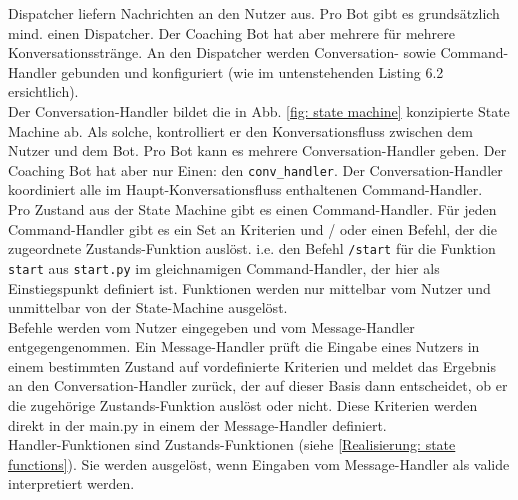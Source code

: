         Dispatcher liefern Nachrichten an den Nutzer aus. Pro Bot gibt es grundsätzlich mind. einen Dispatcher. Der Coaching Bot hat aber mehrere für mehrere Konversationsstränge. An den Dispatcher werden Conversation- sowie Command-Handler gebunden und konfiguriert (wie im untenstehenden Listing 6.2 ersichtlich).\\
        Der Conversation-Handler bildet die in Abb. \ref*{fig: state machine} konzipierte State Machine ab. Als solche, kontrolliert er den Konversationsfluss zwischen dem Nutzer und dem Bot. Pro Bot kann es mehrere Conversation-Handler geben. Der Coaching Bot hat aber nur Einen: den \verb|conv_handler|. Der Conversation-Handler koordiniert alle im Haupt-Konversationsfluss enthaltenen Command-Handler.\\
        Pro Zustand aus der State Machine gibt es einen Command-Handler. Für jeden Command-Handler gibt es ein Set an Kriterien und / oder einen Befehl, der die zugeordnete Zustands-Funktion auslöst. i.e. den Befehl \verb|/start| für die Funktion \verb|start| aus \verb|start.py| im gleichnamigen Command-Handler, der hier als Einstiegspunkt definiert ist. Funktionen werden nur mittelbar vom Nutzer und unmittelbar von der State-Machine ausgelöst.\\
        Befehle werden vom Nutzer eingegeben und vom Message-Handler entgegengenommen. Ein Message-Handler prüft die Eingabe eines Nutzers in einem bestimmten Zustand auf vordefinierte Kriterien und meldet das Ergebnis an den Conversation-Handler zurück, der auf dieser Basis dann entscheidet, ob er die zugehörige Zustands-Funktion auslöst oder nicht. Diese Kriterien werden direkt in der main.py in einem der Message-Handler definiert. \\
        Handler-Funktionen sind Zustands-Funktionen (siehe \ref*{Realisierung: state functions}). Sie werden ausgelöst, wenn Eingaben vom Message-Handler als valide interpretiert werden. 

